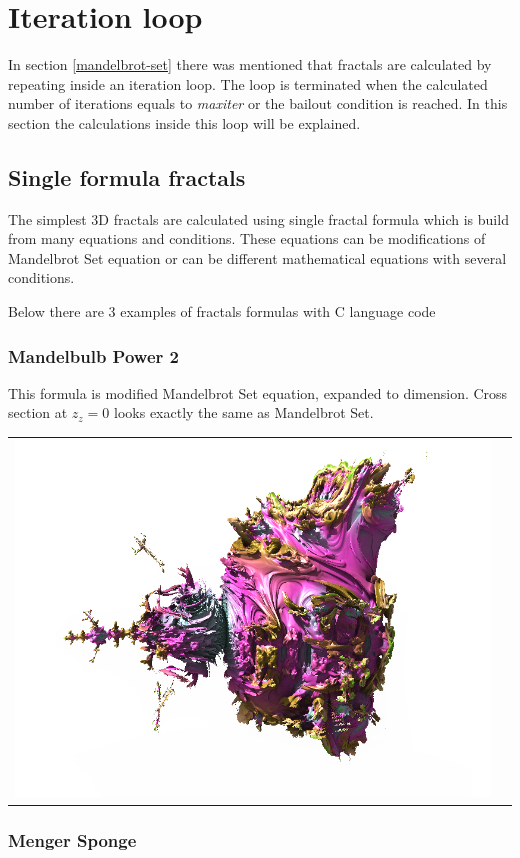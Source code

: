 \section{Iteration loop}\label{iteration-loop}

In section \ref{mandelbrot-set} there was mentioned that fractals are calculated
by repeating inside an iteration loop. The loop is terminated when the calculated
number of iterations equals to \emph{maxiter} or the bailout condition is reached.
In this section the calculations inside this loop will be explained.

\subsection{Single formula fractals}\label{single-formula-fractals}

The simplest 3D fractals are calculated using single fractal formula which is
build from many equations and conditions. These equations can be modifications
of Mandelbrot Set equation or can be different mathematical equations with
several conditions.

Below there are 3 examples of fractals formulas with C language code

\subsubsection{Mandelbulb Power 2} \nopagebreak

This formula is modified Mandelbrot Set equation, expanded to  dimension.
Cross section at $ z_z = 0 $ looks exactly the same as Mandelbrot Set.
\nopagebreak

\begin{tabular}{l l}
	\includegraphics[width=0.3\linewidth]{img/manual/media/formula_mandelbulb_power_2}	
	  &   
	\begin{minipage}[b]{0.5\linewidth}
	
	\end{minipage}
\end{tabular} 

\subsubsection{Menger Sponge} \nopagebreak


